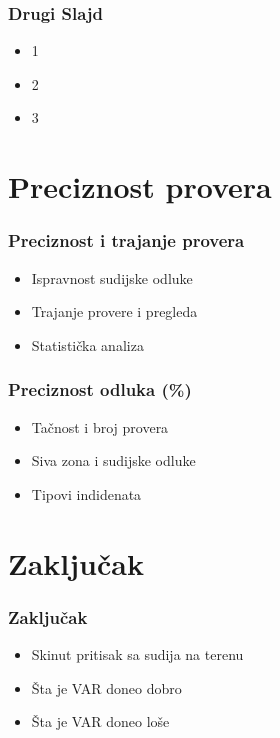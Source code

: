 \documentclass{beamer}
\begin{document}
\begin{frame}
  \frametitle{Drugi Slajd}
  \begin{itemize}
    \item  1
    \item  2
    \item  3
  \end{itemize}
\end{frame}

\section{Preciznost provera}

\begin{frame}
  \frametitle{Preciznost i trajanje provera}
  \begin{itemize}
    \item  Ispravnost sudijske odluke
    \item  Trajanje provere i pregleda
    \item  Statistička analiza
  \end{itemize}
\end{frame}

\begin{frame}
  \frametitle{Preciznost odluka (\%)}
  \begin{itemize}
    \item  Tačnost i broj provera
    \item  Siva zona i sudijske odluke
    \item  Tipovi indidenata
  \end{itemize}
\end{frame}

\section{Zaključak}

\begin{frame}
  \frametitle{Zaključak}
  \begin{itemize}
    \item  Skinut pritisak sa sudija na terenu
    \item  Šta je VAR doneo dobro
    \item  Šta je VAR doneo loše
  \end{itemize}
\end{frame}
\end{document}
